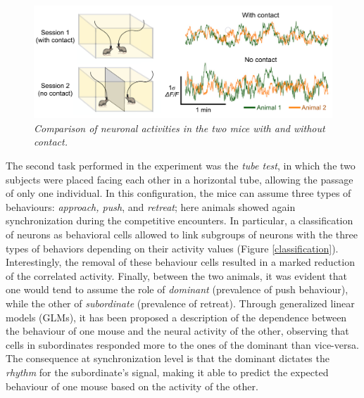 \documentclass[12pt, a4paper]{report}
\begin{document}
\begin{figure}[H]
	\begin{center}
		\includegraphics[scale=.45]{kingsbury.png} 
	\end{center} 
	\caption{\textit{Comparison of neuronal activities in the two mice with and without contact.}} \label{kingsbury}
	
\end{figure}


The second task performed in the experiment was the \textit{tube test}, in which the two subjects were placed facing each other in a horizontal tube, allowing the passage of only one individual. In this configuration, the mice can assume three types of behaviours: \textit{approach, push}, and \textit{retreat}; here animals showed again synchronization during the competitive encounters. In particular, a classification of neurons as behavioral cells allowed to link subgroups of neurons with the three types of behaviors depending on their activity values (Figure \ref{classification}). Interestingly, the removal of these behaviour cells resulted in a marked reduction of the correlated activity. Finally, between the two animals, it was evident that one would tend to assume the role of \textit{dominant} (prevalence of push behaviour), while the other of \textit{subordinate} (prevalence of retreat). Through generalized linear models (GLMs), it has been proposed a description of the dependence between the behaviour of one mouse and the neural activity of the other, observing that cells in subordinates responded more to the ones of the dominant than vice-versa. The consequence at synchronization level is that the dominant dictates the \textit{rhythm} for the subordinate's signal, making it able to predict the expected behaviour of one mouse based on the activity of the other.
\end{document}
